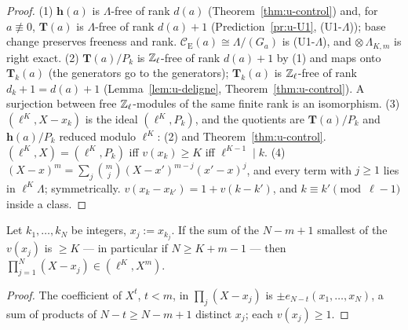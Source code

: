 \documentclass[11pt]{article}
\newcommand{\Iw}{\Lambda}                         %
\newcommand{\hcusp}{\mathbf{h}}                   %
\newcommand{\Tu}{\mathbf{T}}                      %
\newcommand{\Pk}[1]{P_{#1}}                       %
\newcommand{\Eis}{\mathrm{E}}
\newcommand{\Cg}{\mathcal{C}}                     %
\newcommand{\Zl}{\Z_\ell}
\begin{document}
\begin{proof}
(1) $\hcusp(a)$ is $\Iw$-free of rank $d(a)$ (Theorem~\ref{thm:u-control}) and, for $a\not\equiv0$, $\Tu(a)$ is $\Iw$-free of rank $d(a)+1$ (Prediction~\ref{pr:u-U1},
(U1-$\Iw$)); base change preserves freeness and rank. $\Cg_\Eis(a)\cong\Iw/(G_a)$ is (U1-$\Iw$), and $\otimes\,\Iw_{K,m}$ is right exact.
(2) $\Tu(a)/\Pk{k}$ is $\Zl$-free of rank $d(a)+1$ by (1) and maps onto $\Tu_k(a)$ (the generators go to the generators); $\Tu_k(a)$ is $\Zl$-free of rank
$d_k+1=d(a)+1$ (Lemma~\ref{lem:u-deligne}, Theorem~\ref{thm:u-control}). A surjection between free $\Zl$-modules of the same finite rank is an isomorphism.
(3) $(\ell^{K},X-x_k)$ is the ideal $(\ell^{K},\Pk{k})$, and the quotients are $\Tu(a)/\Pk{k}$ and $\hcusp(a)/\Pk{k}$ reduced modulo $\ell^{K}$: (2) and
Theorem~\ref{thm:u-control}. $(\ell^{K},X)=(\ell^{K},\Pk{k})$ iff $v(x_k)\ge K$ iff $\ell^{K-1}\mid k$.
(4) $(X-x)^{m}=\sum_{j}\binom mj(X-x')^{m-j}(x'-x)^{j}$, and every term with $j\ge1$ lies in $\ell^{K}\Iw$; symmetrically. $v(x_k-x_{k'})=1+v(k-k')$, and
$k\equiv k'\pmod{\ell-1}$ inside a class.
\end{proof}

\begin{lemma}\label{lem:u-wtprod}
\PROVED{} Let $k_1,\dots,k_N$ be integers, $x_j:=x_{k_j}$. If the sum of the $N-m+1$ smallest of the $v(x_j)$ is $\ge K$ --- in particular if
$N\ge K+m-1$ --- then $\prod_{j=1}^{N}(X-x_j)\in(\ell^{K},X^{m})$.
\end{lemma}

\begin{proof}
The coefficient of $X^{t}$, $t<m$, in $\prod_j(X-x_j)$ is $\pm e_{N-t}(x_1,\dots,x_N)$, a sum of products of $N-t\ge N-m+1$ distinct $x_j$; each $v(x_j)\ge1$.
\end{proof}
\end{document}
